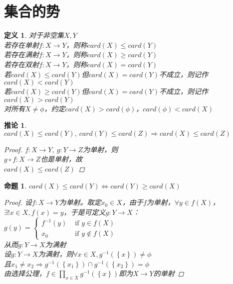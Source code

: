 \documentclass[12pt, a4paper, oneside]{ctexbook}
\newtheorem{definition}[theorem]{定义}
\newtheorem{corollary}[theorem]{推论}
\newtheorem{proposition}[theorem]{命题}
\begin{document}
\section{集合的势}
\begin{definition}
    对于非空集$X,Y$\\
    若存在单射$f:X\rightarrow Y$，则称$card(X)\leq card(Y)$\\
    若存在满射$f:X\rightarrow Y$，则称$card(X)\geq card(Y)$\\
    若存在双射$f:X\rightarrow Y$，则称$card(X)= card(Y)$\\
    若$card(X)\leq card(Y)$但$card(X)= card(Y)$不成立，则记作$card(X)<card(Y)$\\
    若$card(X)\geq card(Y)$但$card(X)= card(Y)$不成立，则记作$card(X)>card(Y)$\\
    对所有$X\neq\phi$，约定$card(X)>card(\phi)$，$card(\phi)<card(X)$
\end{definition}
\begin{corollary}
    $card(X)\leq card(Y),\ card(Y)\leq card(Z)\Rightarrow card(X)\leq card(Z)$
    \begin{proof}
        $f:X\rightarrow Y,\ g:Y\rightarrow Z$为单射，则\\
        $g\circ f:X\rightarrow Z$也是单射，故\\
        $card(X)\leq card(Z)$
    \end{proof}
\end{corollary}
\begin{proposition}
    $card(X)\leq card(Y)\Leftrightarrow card(Y)\geq card(X)$
    \begin{proof}
        设$f:X\rightarrow Y$为单射。取定$x_0\in X$，由于$f$为单射，$\forall y\in f(X)$，\\
        $\exists ! x\in X,f(x)=y$，于是可定义$g:Y\rightarrow X$：\\
        $g(y)=\begin{cases}
            f^{-1}(y)& \text{ if } y\in f(X) \\
            x_0& \text{ if } y\notin f(X)
          \end{cases}$\\
        从而$g:Y\rightarrow X$为满射\\[0.5cm]
        设$g:Y\rightarrow X$为满射，则$\forall x\in X,g^{-1}(\left\{x\right\})\neq\phi$\\
        且$x_1\neq x_2\Rightarrow g^{-1}(\left\{x_1\right\})\cap g^{-1}(\left\{x_2\right\})=\phi$\\
        由选择公理，$f\in \prod_{x\in X}g^{-1}(\left\{x\right\})$即为$X\rightarrow Y$的单射       
    \end{proof}
\end{proposition}
\end{document}
